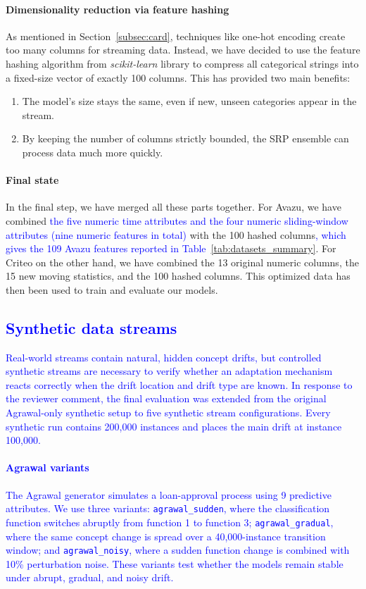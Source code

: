 \documentclass[12pt]{article}
\newcommand{\new}[1]{\textcolor{blue}{#1}}
\begin{document}
\paragraph{Dimensionality reduction via feature hashing}
As mentioned in Section~\ref{subsec:card}, techniques like one-hot encoding create too many columns for streaming data. Instead, we have decided to use the feature hashing algorithm \cite{weinberger2009feature} from \textit{scikit-learn} library to compress all categorical strings into a fixed-size vector of exactly 100 columns. This has provided two main benefits:
\begin{enumerate}
    \item The model's size stays the same, even if new, unseen categories appear in the stream.
    \item By keeping the number of columns strictly bounded, the SRP ensemble can process data much more quickly.
\end{enumerate}

\paragraph{Final state}
In the final step, we have merged all these parts together. For Avazu, we have combined \new{the five numeric time attributes and the four numeric sliding-window attributes (nine numeric features in total)} with the 100 hashed columns\new{, which gives the 109 Avazu features reported in Table~\ref{tab:datasets_summary}}. For Criteo on the other hand, we have combined the 13 original numeric columns, the 15 new moving statistics, and the 100 hashed columns. This optimized data has then been used to train and evaluate our models.


\subsection{\new{Synthetic data streams}}
\label{subsec:synth}

\new{Real-world streams contain natural, hidden concept drifts, but controlled synthetic streams are necessary to verify whether an adaptation mechanism reacts correctly when the drift location and drift type are known. In response to the reviewer comment, the final evaluation was extended from the original Agrawal-only synthetic setup to five synthetic stream configurations. Every synthetic run contains 200,000 instances and places the main drift at instance 100,000.}

\paragraph{\new{Agrawal variants}}
\new{The Agrawal generator \cite{agrawal1993database} simulates a loan-approval process using 9 predictive attributes. We use three variants: \texttt{agrawal\_sudden}, where the classification function switches abruptly from function 1 to function 3; \texttt{agrawal\_gradual}, where the same concept change is spread over a 40,000-instance transition window; and \texttt{agrawal\_noisy}, where a sudden function change is combined with 10\% perturbation noise. These variants test whether the models remain stable under abrupt, gradual, and noisy drift.}
\end{document}

